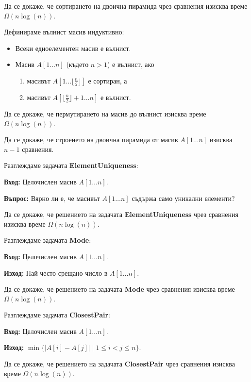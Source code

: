 \begin{problem}
Да се докаже, че сортирането на двоична пирамида чрез сравнения изисква време $\Omega(n \log(n))$.
\end{problem}

\begin{problem}
Дефинираме вълнист масив индуктивно:
\begin{itemize}
    \item Всеки едноелементен масив е вълнист.
    \item Масив $A[1 \dots n]$ (където $n > 1$) е вълнист, ако
          \begin{enumerate}
              \item масивът $A[1 \dots \lfloor \frac{n}{2} \rfloor]$ е сортиран, а
              \item масивът $A[\lfloor \frac{n}{2} \rfloor + 1 \dots n]$ е вълнист.
          \end{enumerate}
\end{itemize}
Да се докаже, че пермутирането на масив до вълнист изисква време $\Omega(n \log(n))$.
\end{problem}

\begin{problem}
Да се докаже, че строенето на двоична пирамида от масив $A[1 \dots n]$ изисква $n - 1$ сравнения.
\end{problem}

\begin{problem}
Разглеждаме задачата \textbf{ElementUniqueness}:

\vspace*{2mm}
\textbf{Вход:} Целочислен масив $A[1 \dots n]$.

\textbf{Въпрос:} Вярно ли е, че масивът $A[1 \dots n]$ съдържа само уникални елементи?
\vspace*{2mm}

Да се докаже, че решението на задачата \textbf{ElementUniqueness} чрез сравнения изисква време $\Omega(n \log(n))$.
\end{problem}

\begin{problem}
Разглеждаме задачата \textbf{Mode}:

\vspace*{2mm}
\textbf{Вход:} Целочислен масив $A[1 \dots n]$.

\textbf{Изход:} Най-често срещано число в $A[1 \dots n]$.
\vspace*{2mm}

Да се докаже, че решението на задачата \textbf{Mode} чрез сравнения изисква време $\Omega(n \log(n))$.
\end{problem}

\begin{problem}
Разглеждаме задачата \textbf{ClosestPair}:

\vspace*{2mm}
\textbf{Вход:} Целочислен масив $A[1 \dots n]$.

\textbf{Изход:} $\min \{ |A[i] - A[j]| \mid 1 \leq i < j \leq n \}$.
\vspace*{2mm}

Да се докаже, че решението на задачата \textbf{ClosestPair} чрез сравнения изисква време $\Omega(n \log(n))$.
\end{problem}